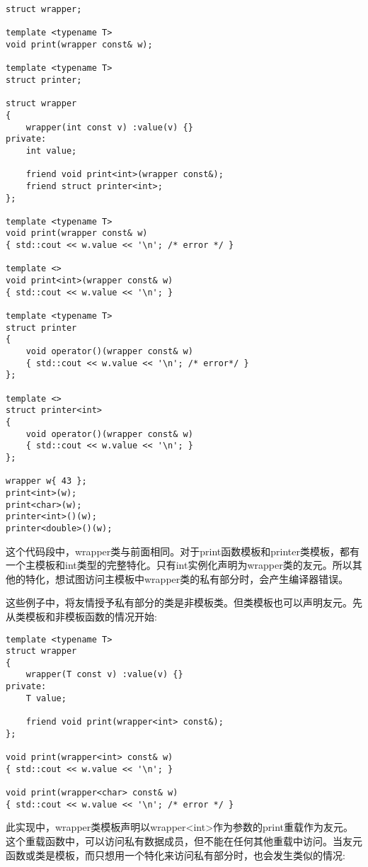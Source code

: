 \begin{lstlisting}[style=styleCXX]
struct wrapper;

template <typename T>
void print(wrapper const& w);

template <typename T>
struct printer;

struct wrapper
{
	wrapper(int const v) :value(v) {}
private:
	int value;
	
	friend void print<int>(wrapper const&);
	friend struct printer<int>;
};

template <typename T>
void print(wrapper const& w)
{ std::cout << w.value << '\n'; /* error */ }

template <>
void print<int>(wrapper const& w)
{ std::cout << w.value << '\n'; }

template <typename T>
struct printer
{
	void operator()(wrapper const& w)
	{ std::cout << w.value << '\n'; /* error*/ }
};

template <>
struct printer<int>
{
	void operator()(wrapper const& w)
	{ std::cout << w.value << '\n'; }
};

wrapper w{ 43 };
print<int>(w);
print<char>(w);
printer<int>()(w);
printer<double>()(w);
\end{lstlisting}

这个代码段中，wrapper类与前面相同。对于print函数模板和printer类模板，都有一个主模板和int类型的完整特化。只有int实例化声明为wrapper类的友元。所以其他的特化，想试图访问主模板中wrapper类的私有部分时，会产生编译器错误。

这些例子中，将友情授予私有部分的类是非模板类。但类模板也可以声明友元。先从类模板和非模板函数的情况开始:

\begin{lstlisting}[style=styleCXX]
template <typename T>
struct wrapper
{
	wrapper(T const v) :value(v) {}
private:
	T value;
	
	friend void print(wrapper<int> const&);
};

void print(wrapper<int> const& w)
{ std::cout << w.value << '\n'; }

void print(wrapper<char> const& w)
{ std::cout << w.value << '\n'; /* error */ }
\end{lstlisting}

此实现中，wrapper类模板声明以wrapper<int>作为参数的print重载作为友元。这个重载函数中，可以访问私有数据成员，但不能在任何其他重载中访问。当友元函数或类是模板，而只想用一个特化来访问私有部分时，也会发生类似的情况:

